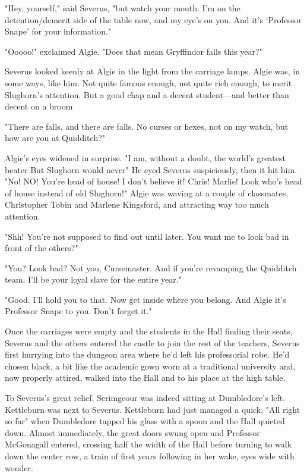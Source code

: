 "Hey, yourself," said Severus, "but watch your mouth. I'm on the detention\slash demerit side of the table now, and my eye's on you. And it's `Professor Snape' for your information."

"Ooooo!" exclaimed Algie. "Does that mean Gryffindor falls this year?"

Severus looked keenly at Algie in the light from the carriage lamps. Algie was, in some ways, like him. Not quite famous enough, not quite rich enough, to merit Slughorn's attention. But a good chap and a decent student—and better than decent on a broom{\el}

"There are falls, and there are falls. No curses or hexes, not on my watch, but how are you at Quidditch?"

Algie's eyes widened in surprise. "I am, without a doubt, the world's greatest beater{\el} But Slughorn would never{\el}" He eyed Severus suspiciously, then it hit him. "No! NO! You're head of house! I don't believe it! Chris! Marlie! Look who's head of house instead of old Slughorn!" Algie was waving at a couple of classmates, Christopher Tobin and Marlene Kingsford, and attracting way too much attention.

"Shh! You're not supposed to find out until later. You want me to look bad in front of the others?"

"You? Look bad? Not you, Cursemaster. And if you're revamping the Quidditch team, I'll be your loyal slave for the entire year."

"Good. I'll hold you to that. Now get inside where you belong. And Algie{\el} it's Professor Snape to you. Don't forget it."

Once the carriages were empty and the students in the Hall finding their seats, Severus and the others entered the castle to join the rest of the teachers, Severus first hurrying into the dungeon area where he'd left his professorial robe. He'd chosen black, a bit like the academic gown worn at a traditional university and, now properly attired, walked into the Hall and to his place at the high table.

To Severus's great relief, Scrimgeour was indeed sitting at Dumbledore's left. Kettleburn was next to Severus. Kettleburn had just managed a quick, "All right so far" when Dumbledore tapped his glass with a spoon and the Hall quieted down. Almost immediately, the great doors swung open and Professor McGonagall entered, crossing half the width of the Hall before turning to walk down the center row, a train of first years following in her wake, eyes wide with wonder.

